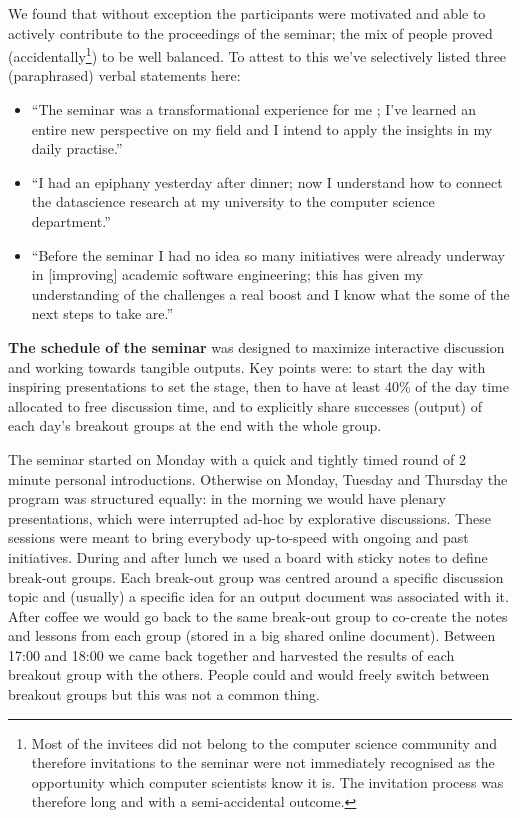 \documentclass[a4paper,UKenglish]{dagrep}
\begin{document}
We found that without exception the participants were motivated and able to actively contribute to the proceedings of the seminar; the mix of people proved (accidentally\footnote{Most of the invitees did not belong to the computer science community and therefore invitations to the seminar were not immediately recognised as the opportunity which computer scientists know it is. The invitation process was therefore long and with a semi-accidental outcome.}) to be well balanced. To attest to this we've selectively listed three (paraphrased) verbal statements here:
\begin{itemize}
\item ``The seminar was a transformational experience for me	; I've learned an entire new perspective on my field and I intend to apply the insights in my daily practise.''
\item ``I had an epiphany yesterday after dinner; now I understand how to connect the datascience research at my university to the computer science department.''
\item ``Before the seminar I had no idea so many initiatives were already underway in [improving] academic software engineering; this has given my understanding of the challenges a real boost and I know what the some of the next steps to take are.''
\end{itemize}

\textbf{The schedule of the seminar} was designed to maximize interactive discussion and working towards tangible outputs. Key points were: to start the day with inspiring presentations to set the stage, then to have at least 40\% of the day time allocated to free discussion time, and to explicitly share successes (output) of each day's breakout groups at the end with the whole group.

The seminar started on Monday with a quick and tightly timed round of 2 minute personal introductions. Otherwise on Monday, Tuesday and Thursday the program was structured equally: in the morning we would have plenary presentations, which were interrupted ad-hoc by explorative discussions. These sessions were meant to bring everybody up-to-speed with ongoing and past initiatives. During and after lunch we used a board with sticky notes to define break-out groups. Each break-out group was centred around a specific discussion topic and (usually) a specific idea for an output document was associated with it. After coffee we would go back to the same break-out group to co-create the notes and lessons from each group (stored in a big shared online document). Between 17:00 and 18:00 we came back together and harvested the results of each breakout group with the others. People could and would freely switch between breakout groups but this was not a common thing.
\end{document}

